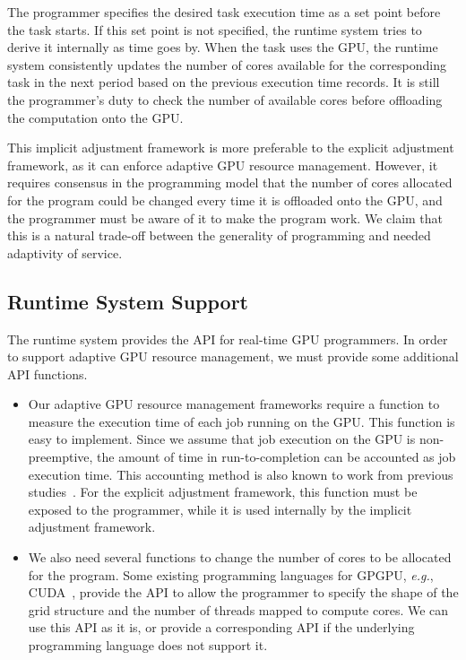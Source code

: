 \documentclass[times, 10pt, twocolumn]{article}
\begin{document}
The programmer specifies the desired task execution time as a set point
before the task starts.
If this set point is not specified, the runtime system tries to derive
it internally as time goes by.
When the task uses the GPU, the runtime system consistently updates the
number of cores available for the corresponding task in the next period
based on the previous execution time records.
It is still the programmer's duty to check the number of available cores before
offloading the computation onto the GPU.

This implicit adjustment framework is more preferable to the explicit
adjustment framework, as it can enforce adaptive GPU resource
management.
However, it requires consensus in the programming model that the number
of cores allocated for the program could be changed every time it is
offloaded onto the GPU, and the programmer must be aware of it to make
the program work.
We claim that this is a natural trade-off between the generality of
programming and needed adaptivity of service.

\subsection{Runtime System Support}
\label{sec:runtime}

The runtime system provides the API for real-time GPU programmers.
In order to support adaptive GPU resource management, we must provide
some additional API functions.

\begin{itemize}
 \item Our adaptive GPU resource management frameworks require a
       function to measure the execution time of each job running on the
       GPU.
       This function is easy to implement.
       Since we assume that job execution on the GPU is non-preemptive,
       the amount of time in run-to-completion can be accounted as job
       execution time.
       This accounting method is also known to work from previous
       studies~\cite{Kato_ATC11, Rossbach_SOSP11}.
       For the explicit adjustment framework, this function must be
       exposed to the programmer, while it is used internally
       by the implicit adjustment framework.
 \item We also need several functions to change the number of cores to
       be allocated for the program.
       Some existing programming languages for GPGPU, \textit{e.g.},
       CUDA~\cite{CUDA}, provide the API to allow the programmer to
       specify the shape of the grid structure and the number of threads
       mapped to compute cores.
       We can use this API as it is, or provide a corresponding API if
       the underlying programming language does not support it.
\end{itemize}
\end{document}
